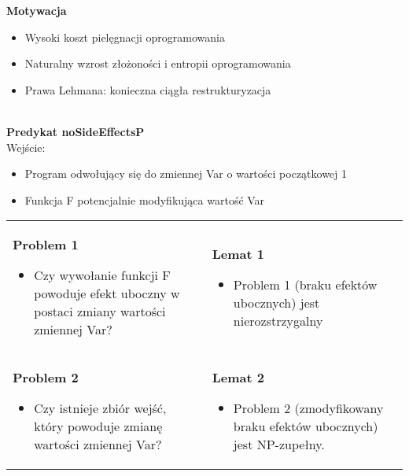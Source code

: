 \documentclass[../main.tex]{subfiles}
\begin{document}
    \textbf{Motywacja}
    \begin{itemize}
        \item Wysoki koszt pielęgnacji oprogramowania
        \item Naturalny wzrost złożoności i entropii
        oprogramowania
        \item Prawa Lehmana: konieczna ciągła restrukturyzacja
    \end{itemize}

    \hfill \\

    \textbf{Predykat noSideEffectsP}\\
    Wejście:
    \begin{itemize}
        \item Program odwołujący się do zmiennej Var o wartości początkowej 1
        \item Funkcja F potencjalnie modyfikująca wartość Var
    \end{itemize}


    \begin{table}[H]
        \begin{center}
            \begin{tabular}{ p{8cm} p{8cm} }
                \textbf{Problem 1}
                \begin{itemize}
                    \item Czy wywołanie funkcji F powoduje efekt uboczny w
                    postaci zmiany wartości zmiennej Var?
                \end{itemize}
                &
                \textbf{Lemat 1}
                \begin{itemize}
                    \item Problem 1 (braku efektów ubocznych) jest
                    nierozstrzygalny
                \end{itemize}
                \\

                \textbf{Problem 2}
                \begin{itemize}
                    \item Czy istnieje zbiór wejść, który powoduje zmianę
                    wartości zmiennej Var?
                \end{itemize}
                &
                \textbf{Lemat 2}
                \begin{itemize}
                    \item Problem 2 (zmodyfikowany braku efektów
                    ubocznych) jest NP-zupełny.
                \end{itemize}
                \\
            \end{tabular}
        \end{center}
    \end{table}
\end{document}
